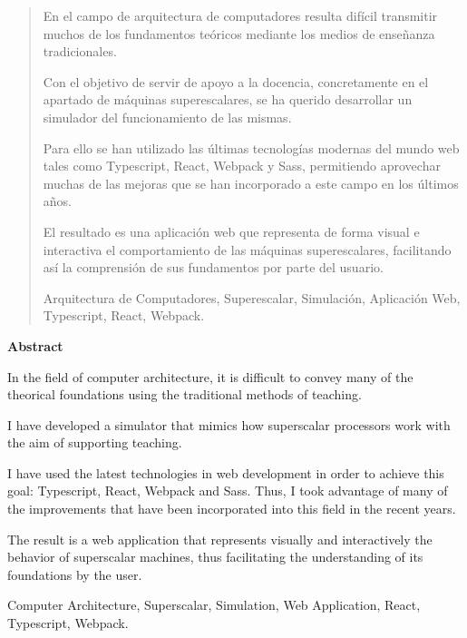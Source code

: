 \documentclass[spanish,a4paper,14pt,oneside]{extreport}
\newenvironment{summary}
{\par\noindent\begin{center}\textbf{Abstract}\end{center}\begin{itshape}\par\noindent}
{\end{itshape}}
\newenvironment{keywords}
{\begin{list}{}{\setlength{\leftmargin}{1em}}\item[\hskip\labelsep \bfseries Keywords:]}
{\end{list}}
\newenvironment{palabrasClave}
{\begin{list}{}{\setlength{\leftmargin}{1em}}\item[\hskip\labelsep \bfseries Palabras clave:]}
{\end{list}}
\begin{document}
\newpage  %
\begin{abstract}
{\em

En el campo de arquitectura de computadores resulta difícil transmitir muchos de los fundamentos
teóricos mediante los medios de enseñanza tradicionales.

\bigskip
Con el objetivo de servir de apoyo a la docencia, concretamente en el apartado de máquinas superescalares,
se ha querido desarrollar un simulador del funcionamiento de las mismas.

\bigskip
Para ello se han utilizado las últimas tecnologías modernas del mundo web tales como Typescript, 
React, Webpack y Sass, permitiendo aprovechar muchas de las mejoras que se han incorporado a 
este campo en los últimos años.

\bigskip
El resultado es una aplicación web que representa de forma visual e interactiva el comportamiento
de las máquinas superescalares, facilitando así la comprensión de sus fundamentos por parte del usuario.  
}

\begin{palabrasClave}
Arquitectura de Computadores, Superescalar, Simulación, Aplicación Web, Typescript, React, Webpack.
\end{palabrasClave}
\end{abstract}


\newpage  %
\begin{summary}
{\em

In the field of computer architecture, it is difficult to convey many of the 
theorical foundations using the traditional methods of teaching.

\bigskip
I have developed a simulator that mimics how superscalar processors work with the 
aim of supporting teaching.

\bigskip
I have used the latest technologies in web development in order to achieve this goal: Typescript,
React, Webpack and Sass. Thus, I took advantage of many of the improvements that have 
been incorporated into this field in the recent years.

\bigskip
The result is a web application that represents visually and interactively the behavior of superscalar machines,
thus facilitating the understanding of its foundations by the user.
}

\begin{keywords}
Computer Architecture, Superscalar, Simulation, Web Application, React, Typescript, Webpack.
\end{keywords}

\end{summary}
\end{document}
